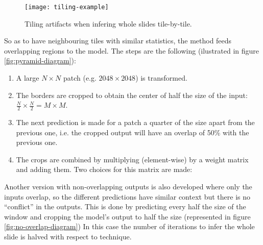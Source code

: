\documentclass[../main.tex]{subfiles}
\begin{document}
\begin{figure}[b]
\centering
\texttt{[image: tiling-example]}
\caption{Tiling artifacts when infering whole slides tile-by-tile.}
\label{fig:tiling-example}
\end{figure}

So as to have neighbouring tiles with similar statistics,
the method feeds overlapping regions to the model.
The steps are the following (ilustrated in figure \ref{fig:pyramid-diagram}):
\begin{enumerate}
\item A large $N \times N$ patch (e.g. $2048 \times 2048$) is transformed.

\item The borders are cropped to obtain the center of half the size of the input:
$\frac{N}{2} \times \frac{N}{2} = M \times M$.

\item The next prediction is made for a patch a quarter of the size apart from
      the previous one, i.e. the cropped output will have an overlap of 50\%
      with the previous one.

\item The crops are combined by multiplying (element-wise) by a weight matrix
      and adding them.  Two choices for this matrix are made:
\end{enumerate}

Another version with non-overlapping outputs is also developed where only the
inputs overlap, so the different predictions have similar context but there is
no ``conflict'' in the outputs.
This is done by predicting every half the size of the window
and cropping the model's output to half the size
(represented in figure \ref{fig:no-overlap-diagram})
In this case the number of iterations to infer the whole slide is halved with
respect to \parencite{Bel2019} technique.
\end{document}
